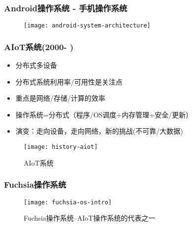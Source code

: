 \begin{frame}[plain]
    \frametitle{Android操作系统 - 手机操作系统}
    
    \begin{figure}
        \centering
        \texttt{[image: android-system-architecture]}
    \end{figure}
    
\end{frame}

\begin{frame}[plain]
	
	\frametitle{AIoT系统(2000- )}
	
	

	\begin{itemize}
		\item 分布式多设备
		\item 分布式系统利用率/可用性是关注点	
		\item 重点是网络/存储/计算的效率
		\item 操作系统=分布式（程序/OS调度+内存管理+安全/更新）
		\item 演变：走向设备，走向网络，新的挑战(不可靠/大数据)
	\end{itemize}
	
	\begin{figure}
		\centering
		\texttt{[image: history-aiot]}
		\caption{AIoT系统}
	\end{figure}
	
\end{frame}

\begin{frame}[plain]
    \frametitle{Fuchsia操作系统}
    
    \begin{figure}
        \centering
        \texttt{[image: fuchsia-os-intro]}
        \caption{Fuchsia操作系统--AIoT操作系统的代表之一}
    \end{figure}
    
\end{frame}



